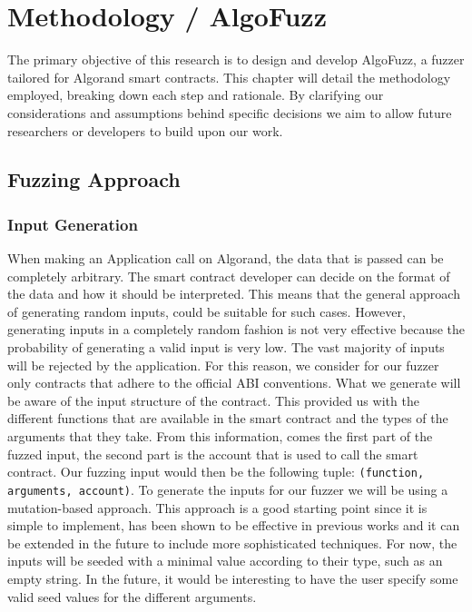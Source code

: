 
\chapter{Methodology / AlgoFuzz}\label{chapter:methodology}
The primary objective of this research is to design and develop AlgoFuzz, a fuzzer tailored for Algorand smart contracts.
This chapter will detail the methodology employed, breaking down each step and rationale.
By clarifying our considerations and assumptions behind specific decisions we aim to allow future researchers or developers to build upon our work.

\section{Fuzzing Approach}

\subsection*{Input Generation}
When making an Application call on Algorand, the data that is passed can be completely arbitrary.
The smart contract developer can decide on the format of the data and how it should be interpreted.
This means that the general approach of generating random inputs, could be suitable for such cases.
However, generating inputs in a completely random fashion is not very effective because the probability of generating a valid input is very low.
The vast majority of inputs will be rejected by the application.
For this reason, we consider for our fuzzer only contracts that adhere to the official \ac{ABI} conventions.
What we generate will be aware of the input structure of the contract.
This provided us with the different functions that are available in the smart contract and the types of the arguments that they take.
From this information, comes the first part of the fuzzed input, the second part is the account that is used to call the smart contract.
Our fuzzing input would then be the following tuple: \texttt{(function, arguments, account)}.
To generate the inputs for our fuzzer we will be using a mutation-based approach.
This approach is a good starting point since it is simple to implement, has been shown to be effective in previous works and it can be extended in the future to include more sophisticated techniques.
For now, the inputs will be seeded with a minimal value according to their type, such as an empty string.
In the future, it would be interesting to have the user specify some valid seed values for the different arguments.


